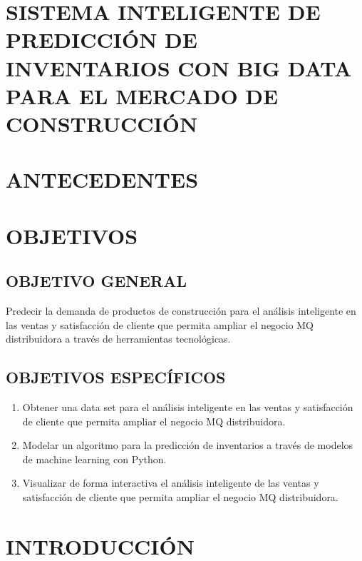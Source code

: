 \documentclass[12pt]{article}
\begin{document}
    \thispagestyle{empty}
    \tableofcontents 
    \listoffigures
    \listoftables

    \newpage
    \setcounter{page}{1}
    \section*{\centering SISTEMA INTELIGENTE DE PREDICCIÓN DE INVENTARIOS CON BIG DATA PARA EL MERCADO DE CONSTRUCCIÓN}
    
    \section{ANTECEDENTES}


    \newpage
    \section{OBJETIVOS}

        \subsection{OBJETIVO GENERAL}
            Predecir la demanda de productos de construcción para el análisis inteligente en las ventas y satisfacción de cliente que permita ampliar el negocio MQ distribuidora a través de herramientas tecnológicas.

        \subsection{OBJETIVOS ESPECÍFICOS}
            \begin{enumerate}
                \item Obtener una data set para el análisis inteligente en las ventas y satisfacción de cliente que permita ampliar el negocio MQ distribuidora.
                \item Modelar un algoritmo para la predicción de inventarios a través de modelos de machine learning con Python.
                \item Visualizar de forma interactiva el análisis inteligente de las ventas y satisfacción de cliente que permita ampliar el negocio MQ distribuidora.
            \end{enumerate}

    
    \newpage      
    \section{INTRODUCCIÓN}
\end{document}
